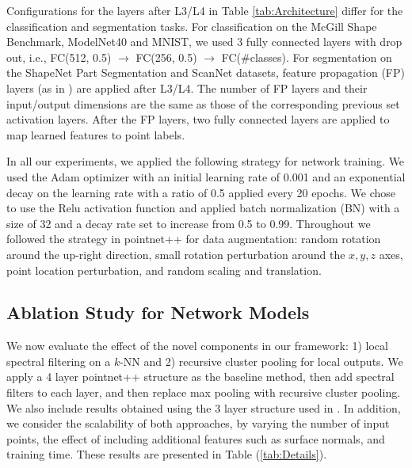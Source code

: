 \documentclass[runningheads]{llncs}
\begin{document}
Configurations for the layers after L3/L4 in Table \ref{tab:Architecture} differ for the classification and segmentation tasks. For classification on the McGill Shape Benchmark, ModelNet40 and MNIST, we used 3 fully connected layers with drop out, i.e., FC(512, 0.5) $\rightarrow$ FC(256, 0.5) $\rightarrow$  FC(\#classes). For segmentation on the ShapeNet Part Segmentation and ScanNet datasets, feature propagation (FP) layers (as in \cite{qi2017pointnet}) are applied after L3/L4. The number of FP layers and their input/output dimensions are the same as those of the corresponding previous set activation layers. After the FP layers, two fully connected layers are applied to map learned features to point labels. 

In all our experiments, we applied the following strategy for network training. We used the Adam optimizer \cite{kingma2014adam}
with an initial learning rate of 0.001 and an exponential decay on the learning rate with a ratio of 0.5 applied every 20 epochs. We chose to use the Relu activation function and applied batch normalization (BN) with a size of 32 and a decay rate set to increase from 0.5 to 0.99. Throughout we followed the strategy in pointnet++ \cite{qi2017pointnet} for data augmentation: random rotation around the up-right direction, small rotation perturbation around the $x,y,z$ axes, point location perturbation, and random scaling and translation.


\subsection{Ablation Study for Network Models}\label{sec:modelAblation}
We now evaluate the effect of the novel components in our framework: 1) local spectral filtering on a $k$-NN and 2) recursive cluster pooling for local outputs. We apply a 4 layer pointnet++ structure as the baseline method, then add spectral filters to each layer, and then replace max pooling with recursive cluster pooling. We also include results obtained using the 3 layer structure used in \cite{qi2017pointnet}.  In addition, we consider the scalability of both approaches, by varying the number of input points, the effect of including additional features such as surface normals, and training time. These results are presented in Table (\ref{tab:Details}). 
\end{document}
